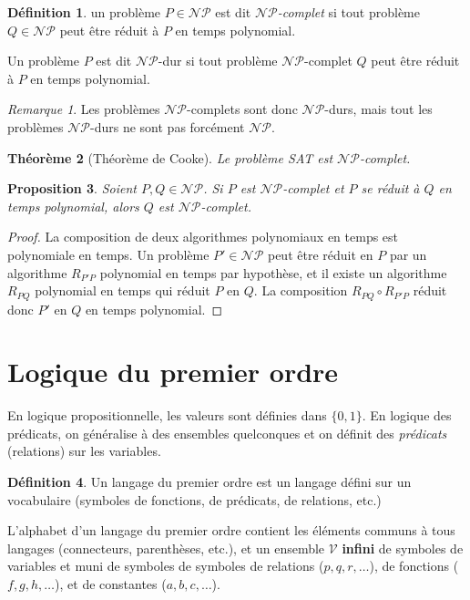 \documentclass{article}
\newtheorem{thm}{Théorème}[section]
\newtheorem{prp}[thm]{Proposition}
\theoremstyle{definition}
\newtheorem{déf}[thm]{Définition}
\theoremstyle{remark}
\newtheorem*{rmq}{Remarque}
\newcommand{\NP}{\mathcal {NP}}
\begin{document}
	\begin{déf} un problème $P \in \NP$ est dit \textit{$\NP$-complet} si tout problème $Q \in \NP$ peut être réduit à $P$ en temps polynomial.

	Un problème $P$ est dit $\NP$-dur si tout problème $\NP$-complet $Q$ peut être réduit à $P$ en temps polynomial.
	\end{déf}

	\begin{rmq} Les problèmes $\NP$-complets sont donc $\NP$-durs, mais tout les problèmes $\NP$-durs ne sont pas forcément $\NP$.
	\end{rmq}

	\begin{thm}[Théorème de Cooke] Le problème SAT est $\NP$-complet.
	\end{thm}

	\begin{prp} Soient $P, Q \in \NP$. Si $P$ est $\NP$-complet et $P$ se réduit à $Q$ en temps polynomial, alors $Q$ est $\NP$-complet.
	\end{prp}

	\begin{proof} La composition de deux algorithmes polynomiaux en temps est polynomiale en temps. Un problème $P' \in \NP$ peut être
	réduit en $P$ par un algorithme $R_{P'P}$ polynomial en temps par hypothèse, et il existe un algorithme $R_{PQ}$ polynomial en temps
	qui réduit $P$ en $Q$. La composition $R_{PQ} \circ R_{P'P}$ réduit donc $P'$ en $Q$ en temps polynomial.
	\end{proof}

\section{Logique du premier ordre}
	En logique propositionnelle, les valeurs sont définies dans $\{0, 1\}$. En logique des prédicats, on généralise à des ensembles quelconques et on définit
	des \textit{prédicats} (relations) sur les variables.

	\begin{déf} Un langage du premier ordre est un langage défini sur un vocabulaire (symboles de fonctions, de prédicats, de relations, etc.)
	\end{déf}

	L'alphabet d'un langage du premier ordre contient les éléments communs à tous langages (connecteurs, parenthèses, etc.), et un ensemble $\mathcal V$
	\textbf{infini} de symboles de variables et muni de symboles de symboles de relations ($p, q, r, \ldots$), de fonctions ($f, g, h, \ldots$), et de
	constantes ($a, b, c, \ldots$).
\end{document}
